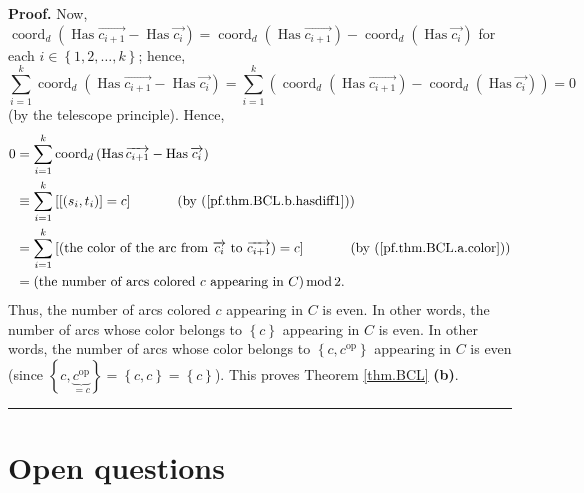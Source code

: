 \documentclass[numbers=enddot,12pt,final,onecolumn,notitlepage,abstracton]{scrartcl}%
\theoremstyle{definition}
\newenvironment{proof}[1][Proof]{\noindent\textbf{#1.} }{\ \rule{0.5em}{0.5em}}
\let\sumnonlimits\sum
\renewcommand{\sum}{\sumnonlimits\limits}
\begin{document}
\begin{proof}
Now, $\operatorname*{coord}\nolimits_{d}\left(  \operatorname*{Has}%
\overrightarrow{c_{i+1}}-\operatorname*{Has}\overrightarrow{c_{i}}\right)
=\operatorname*{coord}\nolimits_{d}\left(  \operatorname*{Has}%
\overrightarrow{c_{i+1}}\right)  -\operatorname*{coord}\nolimits_{d}\left(
\operatorname*{Has}\overrightarrow{c_{i}}\right)  $ for each $i\in\left\{
1,2,\ldots,k\right\}  $; hence,%
\[
\sum_{i=1}^{k}\operatorname*{coord}\nolimits_{d}\left(  \operatorname*{Has}%
\overrightarrow{c_{i+1}}-\operatorname*{Has}\overrightarrow{c_{i}}\right)
=\sum_{i=1}^{k}\left(  \operatorname*{coord}\nolimits_{d}\left(
\operatorname*{Has}\overrightarrow{c_{i+1}}\right)  -\operatorname*{coord}%
\nolimits_{d}\left(  \operatorname*{Has}\overrightarrow{c_{i}}\right)
\right)  =0
\]
(by the telescope principle). Hence,%
\begin{align*}
0  &  =\sum_{i=1}^{k}\operatorname*{coord}\nolimits_{d}\left(
\operatorname*{Has}\overrightarrow{c_{i+1}}-\operatorname*{Has}%
\overrightarrow{c_{i}}\right) \\
&  \equiv\sum_{i=1}^{k}\left[  \left[  \left(  s_{i},t_{i}\right)  \right]
=c\right]  \ \ \ \ \ \ \ \ \ \ \left(  \text{by (\ref{pf.thm.BCL.b.hasdiff1}%
)}\right) \\
&  =\sum_{i=1}^{k}\left[  \left(  \text{the color of the arc from
}\overrightarrow{c_{i}}\text{ to }\overrightarrow{c_{i+1}}\right)  =c\right]
\ \ \ \ \ \ \ \ \ \ \left(  \text{by (\ref{pf.thm.BCL.a.color})}\right) \\
&  =\left(  \text{the number of arcs colored }c\text{ appearing in }C\right)
\operatorname{mod}2.
\end{align*}
Thus, the number of arcs colored $c$ appearing in $C$ is even. In other words,
the number of arcs whose color belongs to $\left\{  c\right\}  $ appearing in
$C$ is even. In other words, the number of arcs whose color belongs to
$\left\{  c,c^{\operatorname*{op}}\right\}  $ appearing in $C$ is even (since
$\left\{  c,\underbrace{c^{\operatorname*{op}}}_{=c}\right\}  =\left\{
c,c\right\}  =\left\{  c\right\}  $). This proves Theorem \ref{thm.BCL}
\textbf{(b)}.
\end{proof}

\section{Open questions}
\end{document}
